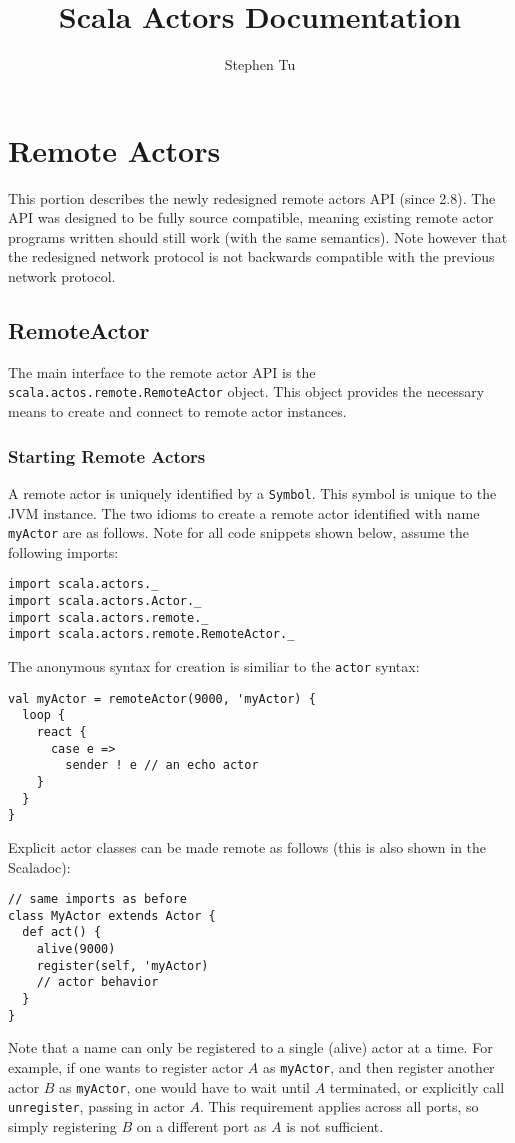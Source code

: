 \documentclass{article}
\title{Scala Actors Documentation}
\author{Stephen Tu}
\begin{document}
\maketitle

\section{Remote Actors}
This portion describes the newly redesigned remote actors API (since 2.8).
The API was designed to be fully source compatible, meaning existing remote
actor programs written should still work (with the same semantics). Note however
that the redesigned network protocol is not backwards compatible with the previous
network protocol.

\subsection{RemoteActor}
The main interface to the remote actor API is the \verb|scala.actos.remote.RemoteActor| object.
This object provides the necessary means to create and connect to remote actor instances.

\subsubsection{Starting Remote Actors}
A remote actor is uniquely identified by a \verb|Symbol|. This symbol is unique to the 
JVM instance. The two idioms to create a remote actor identified with name \verb|myActor|
are as follows. Note for all code snippets shown below, assume the following imports:
\begin{verbatim}
import scala.actors._
import scala.actors.Actor._
import scala.actors.remote._
import scala.actors.remote.RemoteActor._
\end{verbatim}
The anonymous syntax for creation is similiar to the \verb|actor| syntax:
\begin{verbatim}
val myActor = remoteActor(9000, 'myActor) {
  loop {
    react {
      case e => 
        sender ! e // an echo actor
    }
  }
}
\end{verbatim}
Explicit actor classes can be made remote as follows (this is also shown in the Scaladoc):
\begin{verbatim}
// same imports as before
class MyActor extends Actor {
  def act() {
    alive(9000)
    register(self, 'myActor)
    // actor behavior
  }
}
\end{verbatim}
Note that a name can only be registered to a single (alive) actor at a time.
For example, if one wants to register actor $A$ as \verb|myActor|, and then register
another actor $B$ as \verb|myActor|, one would have to wait until $A$ terminated,
or explicitly call \verb|unregister|, passing in actor $A$. This requirement
applies across all ports, so simply registering $B$ on a different port as $A$
is not sufficient.
\end{document}
